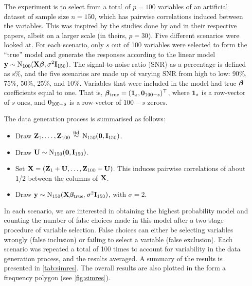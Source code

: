 \documentclass[11pt,twoside,openright]{report}
\begin{document}
The experiment is to select from a total of $p=100$ variables of an  artificial dataset of sample size $n=150$, which has pairwise correlations induced between the variables. 
This was inspired by the studies done by \citet{George1993} and \citet{Kuo1998} in their respective papers, albeit on a larger scale (in theirs, $p=30$).
Five different scenarios were looked at. 
For each scenario, only $s$ out of 100 variables were selected to form the ``true'' model and generate the responses according to the linear model ${\mathbf y}\sim\operatorname{N}_{100}({\mathbf X}{\bm\beta},\sigma^2 {\mathbf I}_{150})$. 
The signal-to-noise ratio (SNR) as a percentage is defined as s\%, and the five scenarios are made up of varying SNR from high to low: 90\%, 75\%, 50\%, 25\%, and 10\%.
Variables that were included in the model had true ${\bm\beta}$ coefficients equal to one.
That is, ${\bm\beta}_\text{true}=({\mathbf 1}_{s},{\mathbf 0}_{100-s})^\top$, where ${\mathbf 1}_{s}$ is a row-vector of $s$ ones, and ${\mathbf 0}_{100-s}$ is a row-vector of $100-s$ zeroes.

\newpage
The data generation process is summarised as follows:
\begin{itemize}
	\item Draw ${\mathbf Z}_1, \dots, {\mathbf Z}_{100} \,\overset{\text{iid}}{\sim}\, \operatorname{N}_{150}({\mathbf 0}, {\mathbf I}_{150})$.
	\item Draw ${\mathbf U} \sim \operatorname{N}_{150}({\mathbf 0}, {\mathbf I}_{150})$.
	\item Set ${\mathbf X} = ({\mathbf Z}_1 + {\mathbf U},\dots,{\mathbf Z}_{100}+{\mathbf U})$. This induces pairwise correlations of about 1/2 between the columns of ${\mathbf X}$.\footnotemark~
	\item Draw ${\mathbf y} \sim \operatorname{N}_{150}({\mathbf X} {\bm\beta}_{\text{true}}, \sigma^2\mathbf I_{150})$, with $\sigma=2$.
\end{itemize}

In each scenario, we are interested in obtaining the highest probability model and counting the number of false choices made in this model after a two-stage procedure of variable selection.
False choices can either be selecting variables wrongly (false inclusion) or failing to select a variable (false exclusion).
Each scenario was repeated a total of 100 times to account for variability in the data generation process, and the results averaged. 
A summary of the results is presented in \cref{tab:simres}.
The overall results are also plotted in the form a frequency polygon (see \cref{fig:simres}).

\end{document}
